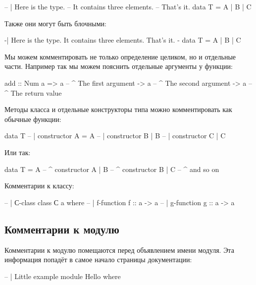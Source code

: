 \begin{code}
-- | Here is the type.
-- It contains three elements.
-- That's it.
data T = A | B | C
\end{code}

Также они могут быть блочными:


\begin{code}
{-|
   Here is the type.
   It contains three elements.
   That's it.
 -}
data T = A | B | C
\end{code}

Мы можем комментировать не только определение целиком, но и отдельные
части. Например так мы можем пояснить отдельные аргументы у функции:


\begin{code}
add :: Num a => a   -- ^ The first argument
             -> a   -- ^ The second argument   
             -> a   -- ^ The return value   
\end{code}

Методы класса и отдельные конструкторы типа можно комментировать как
обычные функции:


\begin{code}
data T
        -- | constructor A    
       = A      
        -- | constructor B
       | B      
        -- | constructor C
       | C     
\end{code}

Или так:


\begin{code}
data T = A      -- ^ constructor A
       | B      -- ^ constructor B
       | C      -- ^ and so on
\end{code}

Комментарии к классу:


\begin{code}
-- | С-class
class С a where
    -- | f-function
    f :: a -> a
    -- | g-function
    g :: a -> a
\end{code}

\subsection{Комментарии к модулю}

Комментарии к модулю помещаются перед объявлением имени модуля. Эта
информация попадёт в самое начало страницы документации:


\begin{code}
-- | Little example
module Hello where
\end{code}

